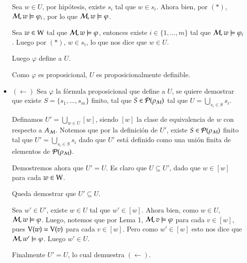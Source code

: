 \begin{demostracion}
\begin{itemize}
        Sea $w \in U$, por hipótesis, existe $s_i$ tal que $w \in s_i$. Ahora bien, por $(*)$, $\mathcal{M}, w \models \varphi_i$, por lo que $\mathcal{M}, w \models \varphi$.

        Sea $w \in \mathrm{W}$ tal que $\mathcal{M}, w \models \varphi$, entonces existe $i \in \{1,...,m\}$ tal que $\mathcal{M}, w \models \varphi_i$. Luego por $(*)$, $w \in s_i$, lo que nos dice que $w \in U$.

        Luego $\varphi$ define a $U$.
        
        Como $\varphi$ es proposicional, $U$ es proposicionalmente definible. 
    
        \item $(\leftarrow)$ Sea $\varphi$ la fórmula proposicional que define a $U$, se quiere demostrar que existe $S = \{s_1,...,s_m\}$ finito, tal que $S \in \mathcal{P}(\rho_{\mathcal{M}})$ tal que $U = \bigcup\limits_{s_i \in S} s_{i}$. 

        Definamos $U' = \bigcup\limits_{w \in U} [w]$, siendo $[w]$ la clase de equivalencia de $w$ con respecto a $A_{\mathcal{M}}$. Notemos que por la definición de $U'$, existe $S \in \mathcal{P}(\rho_{\mathcal{M}})$ finito tal que $U' = \bigcup\limits_{s_i \in S} s_{i}$ dado que $U'$ está definido como una unión finita de elementos de $\mathcal{P}(\rho_{\mathcal{M}})$.

        Demostremos ahora que $U' = U$. Es claro que $U \subseteq U'$, dado que $w \in [w]$ para cada $w \in \mathrm{W}$.

        Queda demostrar que $U' \subseteq U$. 
        
        Sea $w' \in U'$, existe $w \in U$ tal que $w' \in [w]$. Ahora bien, como $w \in U$, $\mathcal{M}, w \models \varphi$. Luego, notemos que por Lema 1, $\mathcal{M}, v \models \varphi$ para cada $v \in [w]$, pues $\mathrm{V}(w) = \mathrm{V}(v)$ para cada $v \in [w]$.
        Pero como $w' \in [w]$ esto nos dice que $\mathcal{M}, w' \models \varphi$. Luego $w' \in U$.

        Finalmente $U' = U$, lo cual demuestra $(\leftarrow)$.
    \end{itemize}

\end{demostracion}


